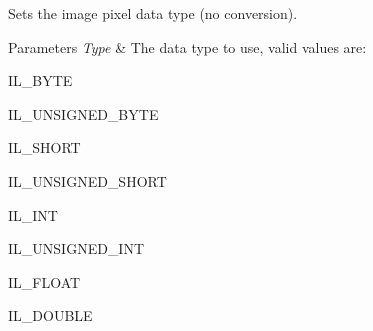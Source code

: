 Sets the image pixel data type (no conversion). 


\begin{DoxyParams}{Parameters}
{\em Type} & The data type to use, valid values are\-:
\begin{DoxyItemize}
\item I\-L\-\_\-\-B\-Y\-T\-E
\item I\-L\-\_\-\-U\-N\-S\-I\-G\-N\-E\-D\-\_\-\-B\-Y\-T\-E
\item I\-L\-\_\-\-S\-H\-O\-R\-T
\item I\-L\-\_\-\-U\-N\-S\-I\-G\-N\-E\-D\-\_\-\-S\-H\-O\-R\-T
\item I\-L\-\_\-\-I\-N\-T
\item I\-L\-\_\-\-U\-N\-S\-I\-G\-N\-E\-D\-\_\-\-I\-N\-T
\item I\-L\-\_\-\-F\-L\-O\-A\-T
\item I\-L\-\_\-\-D\-O\-U\-B\-L\-E 
\end{DoxyItemize}\\
\hline
\end{DoxyParams}
